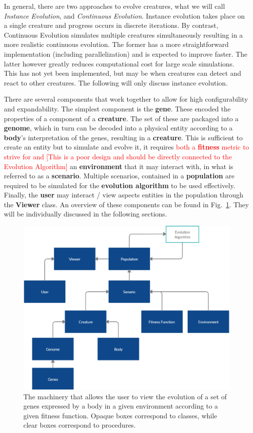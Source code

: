 \documentclass[../../main.tex]{subfiles}
\begin{document}
In general, there are two approaches to evolve creatures, what we will call \textit{Instance Evolution}, and \textit{Continuous Evolution}. Instance evolution takes place on a single creature and progress occurs in discrete iterations. By contrast, Continuous Evolution simulates multiple creatures simultaneously resulting in a more realistic continuous evolution. The former has a more straightforward implementation (including parallelization) and is expected to improve faster. The latter however greatly reduces computational cost for large scale simulations. This has not yet been implemented, but may be when creatures can detect and react to other creatures. The following will only discuss instance evolution.

There are several components that work together to allow for high configurability and expandability. The simplest component is the \textbf{gene}. These encoded the properties of a component of a \textbf{creature}. The set of these are packaged into a \textbf{genome}, which in turn can be decoded into a physical entity according to a \textbf{body}'s interpretation of the genes, resulting in a \textbf{creature}. This is sufficient to create an entity but to simulate and evolve it, it requires \textcolor{red}{both a \textbf{fitness} metric to strive for and [This is a poor design and should be directly connected to the Evolution Algorithm]} an \textbf{environment} that it may interact with, in what is referred to as a \textbf{scenario}. Multiple scenarios, contained in a \textbf{population} are required to be simulated for the \textbf{evolution algorithm} to be used effectively. Finally, the \textbf{user} may interact / view aspects entities in the population through the \textbf{Viewer} class. An overview of these components can be found in Fig.~\ref{fig:overview}. They will be individually discussed in the following sections.
\begin{figure}[H]
	\centering
	\includegraphics[width=\textwidth]{img/hierarchy.png}
	\caption{The machinery that allows the user to view the evolution of a set of genes expressed by a body in a given environment according to a given fitness function. Opaque boxes correspond to classes, while clear boxes correspond to procedures.}
	\label{fig:overview}
\end{figure}
\end{document}
